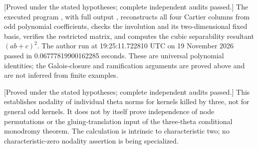 \begin{remark}
\label{rem:three-total-ramification-Cartier-certificate-candidate}
\textup{[Proved under the stated hypotheses; complete independent audits passed.]}
The executed program
,
with full output
,
reconstructs all four Cartier columns from odd polynomial coefficients,
checks the involution and its two-dimensional fixed basis, verifies
the restricted matrix, and computes the cubic separability resultant
$(ab+c)^2$. The author run at 19:25:11.722810 UTC on 19 November
2026 passed in 0.06777819900162285 seconds. These are universal
polynomial identities; the Galois-closure and ramification arguments
are proved above and are not inferred from finite examples.
\end{remark}

\begin{remark}[Scope]
\label{rem:nonordinary-three-torsion-triple-scope-candidate}
\textup{[Proved under the stated hypotheses; complete independent audits passed.]}
This establishes nodality of individual theta norms for kernels killed
by three, not for general odd kernels. It does not by itself prove
independence of node permutations or the gluing-translation input of the three-theta
conditional monodromy theorem. The calculation is intrinsic to
characteristic two; no characteristic-zero nodality assertion is
being specialized.
\end{remark}
